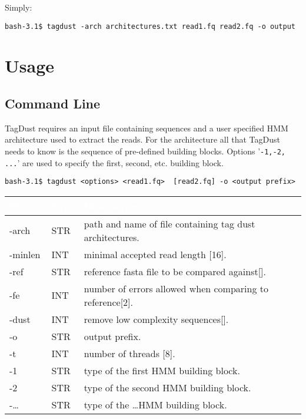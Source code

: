 \documentclass[11pt,a4paper,oneside]{book}
\begin{document}
Simply:

\begin{verbatim}
bash-3.1$ tagdust -arch architectures.txt read1.fq read2.fq -o output
\end{verbatim}
 

\chapter{Usage}

\section{Command Line}
TagDust requires an input file containing sequences and a user specified HMM architecture used to extract the reads. For the architecture all that TagDust needs to know is the sequence of pre-defined building blocks. Options '{\tt -1,-2, ...}' are used to specify the first, second, etc. building block. 

\begin{verbatim}
bash-3.1$ tagdust <options> <read1.fq>  [read2.fq] -o <output prefix> 
\end{verbatim}


\begin{center}
\begin{tabular}{| l | l | p{12cm}|}
\hline
\rowcolor{blue} \textcolor{white}{\scshape Option}		&\textcolor{white}{\scshape Type}		&	\textcolor{white}{\scshape Description}\\ \hline
-arch & STR & path and name of file containing tag dust architectures. \\
-minlen & INT & minimal accepted read length [16].\\
-ref     &  STR &    reference fasta file to be compared against[].\\
-fe &       INT &    number of errors allowed when comparing to reference[2].\\
-dust &	INT &	remove low complexity sequences[].\\
-o & STR & output prefix.\\
-t & INT & number of threads [8].\\
-1 & STR & type of the first HMM building block. \\
-2 & STR & type of the second HMM building block.\\
-\dots & STR & type of the \dots HMM building block.\\
\hline
\end{tabular}
\end{center}
\end{document}
